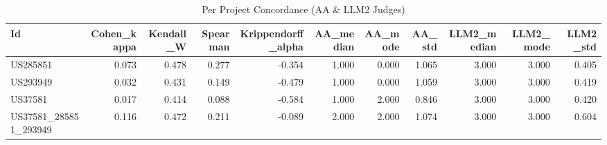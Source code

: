 \begin{table}
\caption{Per Project Concordance (AA & LLM2 Judges)}
\label{tab:per_project_concordance_AA_LLM2_judges}
\begin{tabular}{lrrrrrrrrrr}
\toprule
Id & Cohen_kappa & Kendall_W & Spearman & Krippendorff_alpha & AA_median & AA_mode & AA_std & LLM2_median & LLM2_mode & LLM2_std \\
\midrule
US285851 & 0.073 & 0.478 & 0.277 & -0.354 & 1.000 & 0.000 & 1.065 & 3.000 & 3.000 & 0.405 \\
US293949 & 0.032 & 0.431 & 0.149 & -0.479 & 1.000 & 0.000 & 1.059 & 3.000 & 3.000 & 0.419 \\
US37581 & 0.017 & 0.414 & 0.088 & -0.584 & 1.000 & 2.000 & 0.846 & 3.000 & 3.000 & 0.420 \\
US37581_285851_293949 & 0.116 & 0.472 & 0.211 & -0.089 & 2.000 & 2.000 & 1.074 & 3.000 & 3.000 & 0.604 \\
\bottomrule
\end{tabular}
\end{table}
